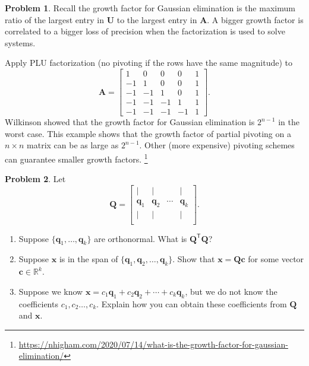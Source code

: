 \documentclass[12pt]{article}
\theoremstyle{definition}
\newtheorem{problem}{Problem}
\renewcommand{\vec}{\mathbf}
\newcommand{\T}{\mathsf{T}}
\begin{document}
\begin{problem}
    Recall the growth factor for Gaussian elimination is the maximum ratio of the largest entry in $\vec{U}$ to the largest entry in $\vec{A}$.
    A bigger growth factor is correlated to a bigger loss of precision when the factorization is used to solve systems.

    Apply PLU factorization (no pivoting if the rows have the same magnitude) to
    \[
    \vec{A} = 
    \begin{bmatrix}
    	1 & 0 & 0 & 0 & 1 \\
    	-1 & 1 & 0 & 0 & 1 \\
    	-1 & -1 & 1 & 0 & 1 \\
    	-1 & -1 & -1 & 1 & 1 \\
    	-1 & -1 & -1 & -1 & 1
    \end{bmatrix}.
    \]
    Wilkinson showed that the growth factor for Gaussian elimination is $2^{n-1}$ in the worst case.
    This example shows that the growth factor of partial pivoting on a $n\times n$ matrix can be as large as $2^{n-1}$. 
    Other (more expensive) pivoting schemes can guarantee smaller growth factors.
    \footnote{\url{https://nhigham.com/2020/07/14/what-is-the-growth-factor-for-gaussian-elimination/}}

\end{problem}

\begin{problem}
Let 
\[
\vec{Q} = \begin{bmatrix}
|&|&&| \\
\vec{q}_1 & \vec{q}_2 & \cdots & \vec{q}_k \\
|&|&&| \\
\end{bmatrix}.
\]

\begin{enumerate}
    \item Suppose $\{\vec{q}_1, \ldots, \vec{q}_k\}$ are orthonormal. What is $\vec{Q}^\T \vec{Q}$?
    \item Suppose $\vec{x}$ is in the span of $\{\vec{q}_1, \vec{q}_2, \ldots, \vec{q}_k\}$. Show that $\vec{x} = \vec{Q}\vec{c}$ for some vector $\vec{c}\in\mathbb{R}^k$.
    \item Suppose we know $\vec{x} = c_1 \vec{q}_1 + c_2 \vec{q}_2 + \cdots + c_k \vec{q}_k$, but we do not know the coefficients $c_1, c_2 \ldots, c_k$. 
       Explain how you can obtain these coefficients from $\vec{Q}$ and $\vec{x}$.
\end{enumerate}

\end{problem}
\end{document}
